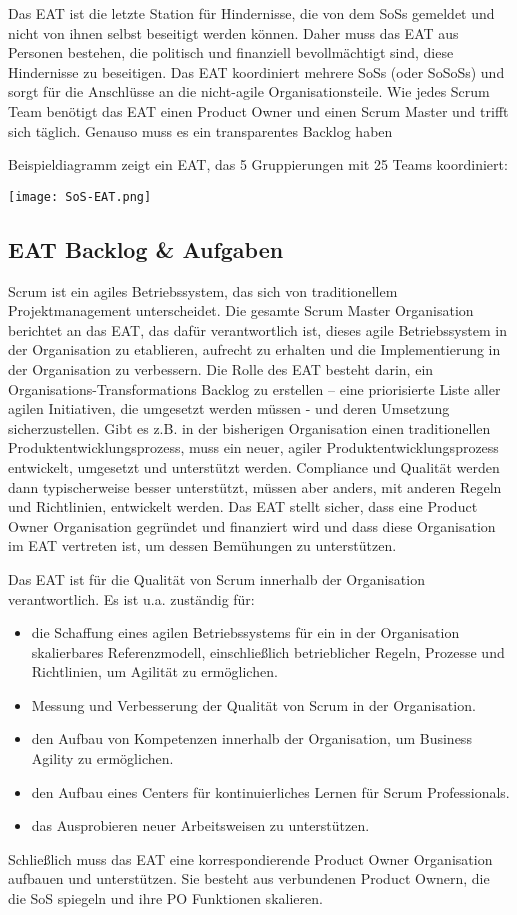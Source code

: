 \documentclass[12pt,a4paper,parskip=full]{scrartcl}
\begin{document}
Das EAT ist die letzte Station für Hindernisse, die von dem SoSs gemeldet und
nicht von ihnen selbst beseitigt werden können. Daher muss das EAT aus Personen
bestehen, die politisch und finanziell bevollmächtigt sind, diese Hindernisse
zu beseitigen. Das EAT koordiniert mehrere SoSs (oder SoSoSs) und sorgt für die
Anschlüsse an die nicht-agile Organisationsteile. Wie jedes Scrum Team benötigt
das EAT einen Product Owner und einen Scrum Master und trifft sich täglich.
Genauso muss es ein transparentes Backlog haben


Beispieldiagramm zeigt ein EAT, das 5 Gruppierungen mit 25 Teams koordiniert:

\texttt{[image: SoS-EAT.png]}

\subsection{EAT Backlog \& Aufgaben}
Scrum ist ein agiles Betriebssystem, das sich von traditionellem Projektmanagement
unterscheidet. Die gesamte Scrum Master Organisation berichtet an das EAT, das
dafür verantwortlich ist, dieses agile Betriebssystem in der Organisation zu
etablieren, aufrecht zu erhalten und die Implementierung in der Organisation zu
verbessern.
Die Rolle des EAT besteht darin, ein Organisations-Transformations Backlog zu
erstellen – eine priorisierte Liste aller agilen Initiativen, die umgesetzt
werden müssen - und deren Umsetzung sicherzustellen. Gibt es z.B. in der
bisherigen Organisation einen traditionellen Produktentwicklungsprozess, muss
ein neuer, agiler Produktentwicklungsprozess entwickelt, umgesetzt und
unterstützt werden. Compliance und Qualität werden dann typischerweise besser
unterstützt, müssen aber anders, mit anderen Regeln und Richtlinien, entwickelt
werden. Das EAT stellt sicher, dass eine Product Owner Organisation gegründet
und finanziert wird und dass diese Organisation im EAT vertreten ist, um
dessen Bemühungen zu unterstützen.

Das EAT ist für die Qualität von Scrum innerhalb der Organisation verantwortlich.
Es ist u.a. zuständig für:
\begin{itemize}
\item die Schaffung eines agilen Betriebssystems für ein in der Organisation
skalierbares Referenzmodell, einschließlich betrieblicher Regeln, Prozesse und
Richtlinien, um Agilität zu ermöglichen.
\item Messung und Verbesserung der Qualität von Scrum in der Organisation.
\item den Aufbau von Kompetenzen innerhalb der Organisation, um Business Agility zu ermöglichen.
\item den Aufbau eines Centers für kontinuierliches Lernen für Scrum Professionals.
\item das Ausprobieren neuer Arbeitsweisen zu unterstützen.
\end{itemize}
Schließlich muss das EAT eine korrespondierende Product Owner Organisation
aufbauen und unterstützen. Sie besteht aus verbundenen Product Ownern, die die
SoS spiegeln und ihre PO Funktionen skalieren.
\end{document}
